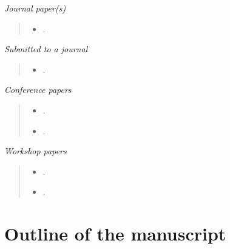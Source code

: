 \begin{fullwidth}
\textit{Journal paper(s)} %
    \begin{quote}
      \begin{itemize}
        \item[\paperIcon] .
      \end{itemize}
    \end{quote}
\end{fullwidth}

\begin{fullwidth}
\textit{Submitted to a journal} %
\label{par:working paper}
    \begin{quote}
      \begin{itemize}
        \item[\paperIcon] .
      \end{itemize}
    \end{quote}
\end{fullwidth}

\begin{fullwidth}
\textit{Conference papers} %
\label{par:conferences}
    \begin{quote}
      \begin{itemize}
        \setlength{\itemsep}{5pt}
        \item[\conferenceIcon] .
        \item[\conferenceIcon] .
      \end{itemize}
    \end{quote}
\end{fullwidth}

\begin{fullwidth}
\textit{Workshop papers} %
\label{par:workshops}
    \begin{quote}
      \begin{itemize}
        \setlength{\itemsep}{5pt}
        \item[\conferenceIcon] .
        \item[\conferenceIcon] .
      \end{itemize}
    \end{quote}
\end{fullwidth}

\section{Outline of the manuscript} %
\label{sec:outline}

